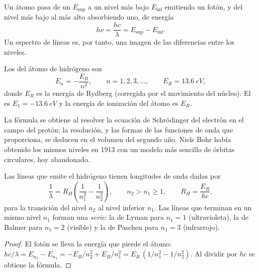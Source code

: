 Un átomo pasa de un  $E_{\text{sup}}$ a un nivel más bajo
$E_{\text{inf}}$ emitiendo un fotón, y del nivel más bajo al más alto
absorbiendo uno, de energía
\[
  h\nu = \frac{hc}{\lambda} = E_{\text{sup}} - E_{\text{inf}} .
\]
Un espectro de líneas es, por tanto, una imagen de las diferencias entre
los niveles.

\begin{theorem}\label{thm:b1:quantum-numbers:levels}
Los  del átomo de hidrógeno son
\[
  E_n = -\frac{E_R}{n^2}, \qquad n = 1, 2, 3, \dots,
  \qquad E_R = \qty{13.6}{eV},
\]
donde $E_R$ es la energía de Rydberg (corregida por el movimiento del
núcleo). El  es $E_1 = \qty{-13.6}{eV}$ y la energía de
ionización del átomo es $E_R$.
\end{theorem}
\admitted

\begin{remark}\label{rem:b1:quantum-numbers:schrodinger}
La fórmula se obtiene al resolver la ecuación de Schrödinger del electrón
en el campo del protón; la resolución, y las formas de las funciones de
onda que proporciona, se deducen en el volumen del segundo año. Niels Bohr
había obtenido los mismos niveles en 1913 con un modelo más sencillo de
órbitas circulares, hoy abandonado.
\end{remark}

\begin{proposition}\label{prop:b1:quantum-numbers:rydberg}
Las líneas que emite el hidrógeno tienen longitudes de onda dadas por
\[
  \frac{1}{\lambda} = R_H\left(\frac{1}{n_1^2} - \frac{1}{n_2^2}\right),
  \qquad n_2 > n_1 \ge 1, \qquad R_H = \frac{E_R}{hc},
\]
para la transición del nivel $n_2$ al nivel inferior $n_1$. Las líneas que
terminan en un mismo nivel $n_1$ forman una \emph{serie}: la de Lyman para
$n_1 = 1$ (ultravioleta), la de Balmer para $n_1 = 2$ (visible) y la de
Paschen para $n_1 = 3$ (infrarrojo).
\end{proposition}

\begin{proof}
El fotón se lleva la energía que pierde el átomo:
$hc/\lambda = E_{n_2} - E_{n_1} = -E_R/n_2^2 + E_R/n_1^2
= E_R\,(1/n_1^2 - 1/n_2^2)$. Al dividir por $hc$ se obtiene la fórmula.
\end{proof}

